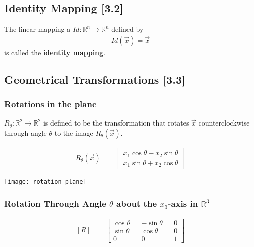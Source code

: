 \documentclass[a4paper,9pt]{extarticle}
\begin{document}
\begin{multicols*}{2}
\subsection{Identity Mapping [3.2]}
The linear mapping a $Id: \mathbb{R}^n \to \mathbb{R}^n$ defined by
\begin{equation} \label{3.2-5}
    \begin{split}
        Id(\vec{x}) = \vec{x}
    \end{split}
\end{equation}
is called the \textbf{identity mapping}.


\subsection{Geometrical Transformations [3.3]}

\subsubsection{Rotations in the plane}
$R_{\theta} : \mathbb{R}^2 \to \mathbb{R}^2$ is defined to be the transformation that rotates $\vec{x}$ counterclockwise through angle $\theta$ to the image $R_{\theta}(\vec{x})$.

\begin{equation} \label{3.3-1}
    \begin{split}
        R_{\theta}(\vec{x}) & = \begin{bmatrix}x_1 \cos{\theta} - x_2 \sin{\theta} \\ x_1 \sin{\theta} + x_2 \cos{\theta}\end{bmatrix}
    \end{split}
\end{equation}

{\centering \texttt{[image: rotation\_plane]} \par}


\subsubsection{Rotation Through Angle $\theta$ about the $x_3$-axis in $\mathbb{R}^3$}
\begin{equation} \label{3.3-3}
    \begin{split}
        [R] & = \begin{bmatrix}\cos{\theta} && -\sin{\theta} && 0 \\ \sin{\theta} && \cos{\theta} && 0 \\ 0 && 0 && 1\end{bmatrix}
    \end{split}
\end{equation}


\end{multicols*}
\end{document}
